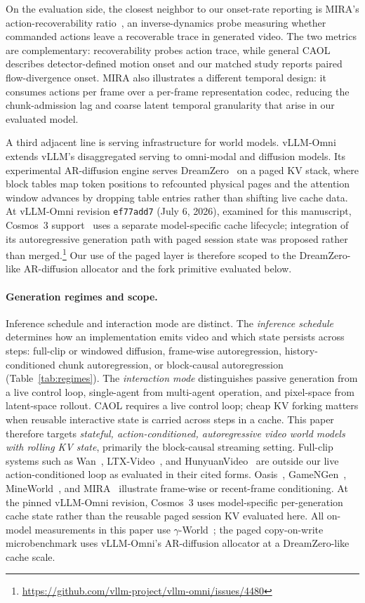 \documentclass[11pt]{article}
\newcommand{\caol}{CAOL}
\begin{document}
On the evaluation side, the closest neighbor to our onset-rate reporting is MIRA's action-recoverability ratio~\cite{mira}, an inverse-dynamics probe measuring whether commanded actions leave a recoverable trace in generated video. The two metrics are complementary: recoverability probes action trace, while general \caol{} describes detector-defined motion onset and our matched study reports paired flow-divergence onset. MIRA also illustrates a different temporal design: it consumes actions per frame over a per-frame representation codec, reducing the chunk-admission lag and coarse latent temporal granularity that arise in our evaluated model.

A third adjacent line is serving infrastructure for world models. vLLM-Omni~\cite{vllmomni} extends vLLM's disaggregated serving to omni-modal and diffusion models. Its experimental AR-diffusion engine serves DreamZero~\cite{dreamzero} on a paged KV stack, where block tables map token positions to refcounted physical pages and the attention window advances by dropping table entries rather than shifting live cache data. At vLLM-Omni revision \texttt{ef77add7} (July 6, 2026), examined for this manuscript, Cosmos~3 support~\cite{cosmos3} uses a separate model-specific cache lifecycle; integration of its autoregressive generation path with paged session state was proposed rather than merged.\footnote{\url{https://github.com/vllm-project/vllm-omni/issues/4480}} Our use of the paged layer is therefore scoped to the DreamZero-like AR-diffusion allocator and the fork primitive evaluated below.

\paragraph{Generation regimes and scope.}
Inference schedule and interaction mode are distinct. The \emph{inference schedule} determines how an implementation emits video and which state persists across steps: full-clip or windowed diffusion, frame-wise autoregression, history-conditioned chunk autoregression, or block-causal autoregression (Table~\ref{tab:regimes}). The \emph{interaction mode} distinguishes passive generation from a live control loop, single-agent from multi-agent operation, and pixel-space from latent-space rollout. \caol{} requires a live control loop; cheap KV forking matters when reusable interactive state is carried across steps in a cache. This paper therefore targets \emph{stateful, action-conditioned, autoregressive video world models with rolling KV state}, primarily the block-causal streaming setting. Full-clip systems such as Wan~\cite{wan}, LTX-Video~\cite{ltx}, and HunyuanVideo~\cite{hunyuanvideo} are outside our live action-conditioned loop as evaluated in their cited forms. Oasis~\cite{oasis}, GameNGen~\cite{gamengen}, MineWorld~\cite{mineworld}, and MIRA~\cite{mira} illustrate frame-wise or recent-frame conditioning. At the pinned vLLM-Omni revision, Cosmos~3 uses model-specific per-generation cache state rather than the reusable paged session KV evaluated here. All on-model measurements in this paper use $\gamma$-World~\cite{gammaworld}; the paged copy-on-write microbenchmark uses vLLM-Omni's AR-diffusion allocator at a DreamZero-like cache scale.
\end{document}
